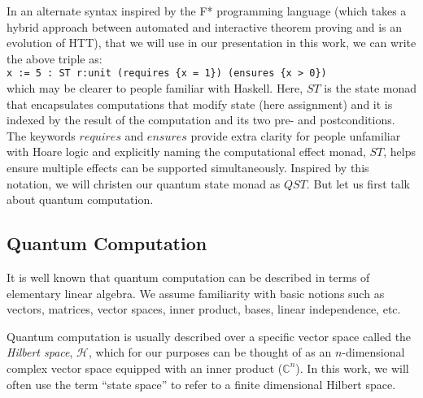\documentclass[adraft,creativecommons]{eptcs}
\theoremstyle{definition}
\theoremstyle{remark}
\begin{document}
In an alternate syntax inspired by the F* programming language (which takes a hybrid approach between automated and interactive theorem proving and is an evolution of HTT), that we will use in our presentation in this work, we can write the above triple as:\medskip\\
\indent\indent\lstinline[language=QHaskell]!x := 5 : ST r:unit (requires {x = 1}) (ensures {x > 0})!
\medskip\\which may be clearer to people familiar with Haskell. Here, $ST$ is the state monad that encapsulates computations that modify state (here assignment) and it is indexed by the result of the computation and its two pre- and postconditions. The keywords $requires$ and $ensures$ provide extra clarity for people unfamiliar with Hoare logic and explicitly naming the computational effect monad, $ST$, helps ensure multiple effects can be supported simultaneously. Inspired by this notation, we will christen our quantum state monad as $QST$. But let us first talk about quantum computation.

\subsection{Quantum Computation}
It is well known that quantum computation can be described in terms of elementary linear algebra. We assume familiarity with basic notions such as vectors, matrices, vector spaces, inner product, bases, linear independence, etc.

Quantum computation is usually described over a specific vector space called the \textit{Hilbert space}, $\mathcal{H}$, which for our purposes can be thought of as an $n$-dimensional complex vector space equipped with an inner product ($\mathbb{C}^n$). In this work, we will often use the term ``state space'' to refer to a finite dimensional Hilbert space.
\end{document}
